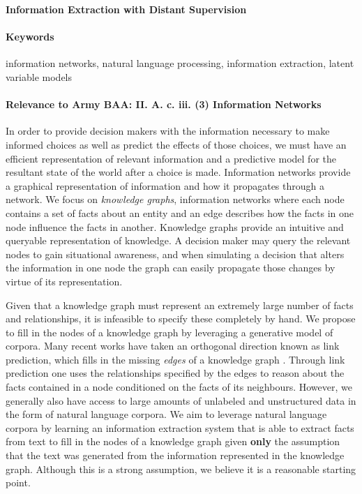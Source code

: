\documentclass[12pt]{article}
\begin{document}

\begin{center}
\textbf{Information Extraction with Distant Supervision}
\end{center}

\paragraph{Keywords}
information networks, natural language processing, information extraction, latent variable models

\paragraph{Relevance to Army BAA: II. A. c. iii. (3) Information Networks}
In order to provide decision makers with the information
necessary to make informed choices as well as predict the effects of those choices,
we must have an efficient representation of relevant information and a predictive model
for the resultant state of the world after a choice is made.
Information networks provide a graphical representation of information and how it
propagates through a network.
We focus on \textit{knowledge graphs}, information networks where each node contains a set of facts
about an entity and an edge describes how the facts in one node influence the facts in another.
Knowledge graphs provide an intuitive and queryable representation of knowledge.
A decision maker may query the relevant nodes to gain situational awareness, and
when simulating a decision that alters the information in one node
the graph can easily propagate those changes by virtue of its representation.

Given that a knowledge graph must represent an extremely large number of facts and relationships,
it is infeasible to specify these completely by hand.
We propose to fill in the nodes of a knowledge graph by leveraging a generative model
of corpora.
Many recent works have taken an orthogonal direction known as link prediction,
which fills in the missing \textit{edges} of a knowledge graph \citep{chen2018diva}.
Through link prediction one uses the relationships
specified by the edges to reason about the facts contained in a node conditioned on
the facts of its neighbours.
However, we generally also have access to large amounts of unlabeled and unstructured data
in the form of natural language corpora.
We aim to leverage natural language corpora by
learning an information extraction system that is able to 
extract facts from text to fill in the nodes of a knowledge graph
given \textbf{only} the assumption that the text was generated from the information
represented in the knowledge graph.
Although this is a strong assumption, we believe it is a reasonable starting point.
\end{document}

